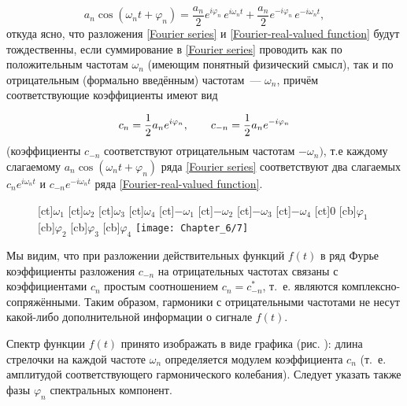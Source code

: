 \begin{equation*}
	a_n\cos(\omega_nt+\varphi_n)=\frac{a_n}{2}e^{i\varphi_n}\,e^{i\omega_n t}+\frac{a_n}{2}e^{-i\varphi_n}\,e^{-i\omega_n t},
\end{equation*}
откуда ясно, что разложения \eqref{Fourier series} и \eqref{Fourier-real-valued function} будут тождественны, если суммирование в \eqref{Fourier series} проводить как по
положительным частотам $\omega_n$ (имеющим понятный физический смысл), так и по отрицательным (формально введённым)
частотам~--- $\omega_n$, причём соответствующие коэффициенты имеют вид

\begin{equation}
	\eqmark{Fourier-coefficient}
	c_n =\frac{1}{2}a_n e^{i\varphi_n}, \qquad c_{-n}=\frac{1}{2}a_n e^{-i\varphi_n}
\end{equation}
(коэффициенты $c_{-n}$ соответствуют отрицательным частотам $-\omega_n)$, т.е каждому слагаемому $a_n\cos(\omega_nt+\varphi_n)$
ряда \eqref{Fourier series} соответствуют два слагаемых $c_ne^{i\omega_n t}$ и $c_{-n}e^{-i\omega_n t}$ ряда \eqref{Fourier-real-valued function}.

\begin{wrapfigure}{r}{0.35\textwidth}
	[ct]{$\omega_1$}
	[ct]{$\omega_2$}
	[ct]{$\omega_3$}
	[ct]{$\omega_4$}
	[ct]{$-\omega_{1}$}
	[ct]{$-\omega_{2}$}
	[ct]{$-\omega_{3}$}
	[ct]{$-\omega_{4}$}
	[ct]{0}
	[cb]{$\varphi_1$}
	[cb]{$\varphi_2$}
	[cb]{$\varphi_3$}
	[cb]{$\varphi_4$}
	\texttt{[image: Chapter\_6/7]}
	\caption{}
\end{wrapfigure}

Мы видим, что при разложении действительных функций $f(t)$ в ряд Фурье коэффициенты разложения $c_{-n}$ на отрицательных
частотах связаны с коэффициентами $c_n$ простым соотношением $c_n=c_{-n}^*$, т.~е. являются комплексно-сопряжёнными.
Таким образом, гармоники с отрицательными частотами не несут какой-либо дополнительной информации о сигнале $f(t)$.

Спектр функции $f(t)$ принято изображать в виде графика (рис. ): длина стрелочки на каждой частоте $\omega_n$ определяется
модулем коэффициента $c_n$ (т.~е. амплитудой соответствующего гармонического колебания). Следует указать также фазы
$\varphi_n$ спектральных компонент.

